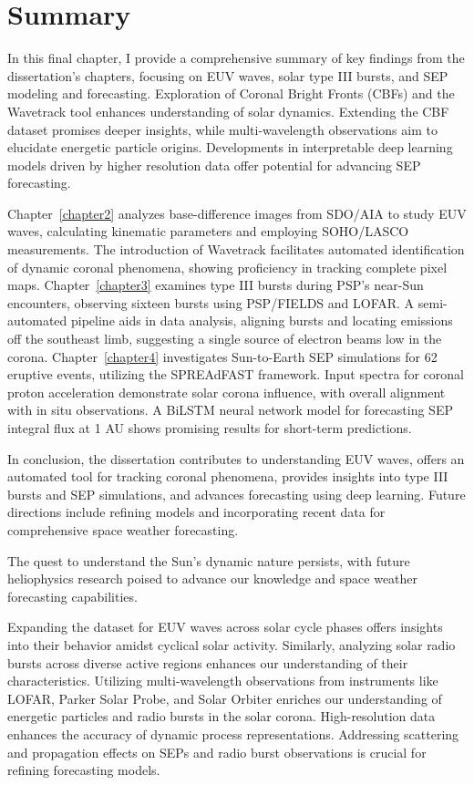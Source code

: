\chapter{Summary}
\label{chapter5}
In this final chapter, I provide a comprehensive summary of key findings from the dissertation's chapters, focusing on EUV waves, solar type III bursts, and SEP modeling and forecasting. Exploration of Coronal Bright Fronts (CBFs) and the Wavetrack tool enhances understanding of solar dynamics. Extending the CBF dataset promises deeper insights, while multi-wavelength observations aim to elucidate energetic particle origins. Developments in interpretable deep learning models driven by higher resolution data offer potential for advancing SEP forecasting.

Chapter~\ref{chapter2} analyzes base-difference images from SDO/AIA to study EUV waves, calculating kinematic parameters and employing SOHO/LASCO measurements. The introduction of Wavetrack facilitates automated identification of dynamic coronal phenomena, showing proficiency in tracking complete pixel maps.
Chapter~\ref{chapter3} examines type III bursts during PSP's near-Sun encounters, observing sixteen bursts using PSP/FIELDS and LOFAR. A semi-automated pipeline aids in data analysis, aligning bursts and locating emissions off the southeast limb, suggesting a single source of electron beams low in the corona. 
Chapter~\ref{chapter4} investigates Sun-to-Earth SEP simulations for 62 eruptive events, utilizing the SPREAdFAST framework. Input spectra for coronal proton acceleration demonstrate solar corona influence, with overall alignment with in situ observations. A BiLSTM neural network model for forecasting SEP integral flux at 1 AU shows promising results for short-term predictions.

In conclusion, the dissertation contributes to understanding EUV waves, offers an automated tool for tracking coronal phenomena, provides insights into type III bursts and SEP simulations, and advances forecasting using deep learning. Future directions include refining models and incorporating recent data for comprehensive space weather forecasting.

The quest to understand the Sun's dynamic nature persists, with future heliophysics research poised to advance our knowledge and space weather forecasting capabilities.

Expanding the dataset for EUV waves across solar cycle phases offers insights into their behavior amidst cyclical solar activity. Similarly, analyzing solar radio bursts across diverse active regions enhances our understanding of their characteristics.
Utilizing multi-wavelength observations from instruments like LOFAR, Parker Solar Probe, and Solar Orbiter enriches our understanding of energetic particles and radio bursts in the solar corona. High-resolution data enhances the accuracy of dynamic process representations.
Addressing scattering and propagation effects on SEPs and radio burst observations is crucial for refining forecasting models.

